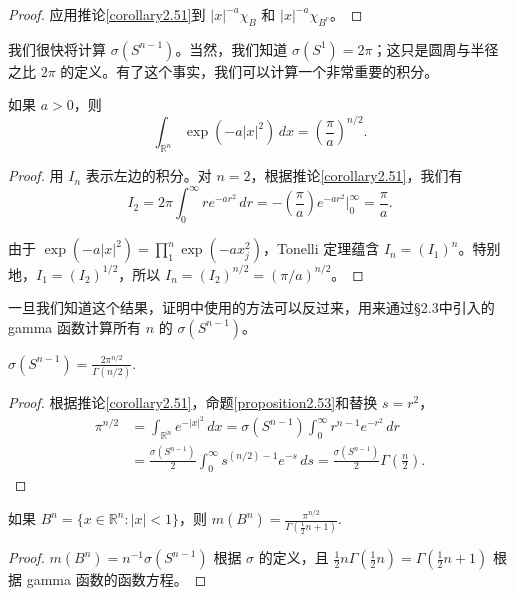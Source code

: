 \documentclass[lang=cn,10pt,thmcnt=section]{elegantbook}
\begin{document}
\begin{proof}
应用推论\ref{corollary2.51}到 $|x|^{-a}\chi_B$ 和 $|x|^{-a}\chi_{B^c}$。
\end{proof}

我们很快将计算 $\sigma(S^{n-1})$。当然，我们知道 $\sigma(S^1) = 2\pi$；这只是圆周与半径之比 $2\pi$ 的定义。有了这个事实，我们可以计算一个非常重要的积分。

\begin{proposition}\label{proposition2.53}
如果 $a > 0$，则
\[\int_{\mathbb{R}^n} \exp(-a|x|^2)\,dx = \left(\frac{\pi}{a}\right)^{n/2}.\]
\end{proposition}

\begin{proof}
用 $I_n$ 表示左边的积分。对 $n = 2$，根据推论\ref{corollary2.51}，我们有
\[I_2 = 2\pi \int_0^\infty re^{-ar^2}\,dr = -\left(\frac{\pi}{a}\right)e^{-ar^2}\bigg|_0^\infty = \frac{\pi}{a}.\]

由于 $\exp(-a|x|^2) = \prod_1^n \exp(-ax_j^2)$，Tonelli 定理蕴含 $I_n = (I_1)^n$。特别地，$I_1 = (I_2)^{1/2}$，所以 $I_n = (I_2)^{n/2} = (\pi/a)^{n/2}$。
\end{proof}

一旦我们知道这个结果，证明中使用的方法可以反过来，用来通过§2.3中引入的 gamma 函数计算所有 $n$ 的 $\sigma(S^{n-1})$。

\begin{proposition}\label{proposition2.54}
$\sigma(S^{n-1}) = \frac{2\pi^{n/2}}{\Gamma(n/2)}$.
\end{proposition}


\begin{proof}
根据推论\ref{corollary2.51}，命题\ref{proposition2.53}和替换 $s = r^2$，
\begin{align*}
\pi^{n/2} &= \int_{\mathbb{R}^n} e^{-|x|^2}\,dx = \sigma(S^{n-1})\int_0^\infty r^{n-1}e^{-r^2}\,dr\\
&= \frac{\sigma(S^{n-1})}{2}\int_0^\infty s^{(n/2)-1}e^{-s}\,ds = \frac{\sigma(S^{n-1})}{2}\Gamma\left(\frac{n}{2}\right).
\end{align*}
\end{proof}

\begin{corollary}\label{corollary2.55}
如果 $B^n = \{x \in \mathbb{R}^n : |x| < 1\}$，则 $m(B^n) = \frac{\pi^{n/2}}{\Gamma(\frac{1}{2}n + 1)}$.
\end{corollary}

\begin{proof}
$m(B^n) = n^{-1}\sigma(S^{n-1})$ 根据 $\sigma$ 的定义，且 $\frac{1}{2}n\Gamma(\frac{1}{2}n) = \Gamma(\frac{1}{2}n + 1)$ 根据 gamma 函数的函数方程。
\end{proof}
\end{document}
